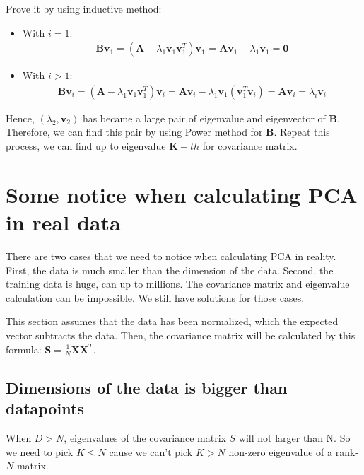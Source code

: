 \documentclass[a4paper, 12pt]{report}
\begin{document}
Prove it by using inductive method:
\begin{itemize}
    \item With $i = 1$: 
        \begin{eqnarray*}\mathbf{Bv}_1 = (\mathbf{A} - \lambda_1 \mathbf{v}_1\mathbf{v}_1^T) \mathbf{v_1} = \mathbf{Av}_1 - \lambda_1 \mathbf{v}_1 = \mathbf{0} 
        \end{eqnarray*}
    \item With $i > 1$:
        \begin{eqnarray*}
        \mathbf{Bv}_i = (\mathbf{A} - \lambda_1 \mathbf{v}_1 \mathbf{v}_1^T)\mathbf{v}_i = \mathbf{Av}_i - \lambda_1 \mathbf{v}_1 (\mathbf{v}_1^T \mathbf{v}_i) = \mathbf{Av}_i = \lambda_i \mathbf{v}_i
        \end{eqnarray*}
\end{itemize}



Hence, $(\lambda_2, \mathbf{v}_2)$ has became a large pair of eigenvalue and eigenvector of $\mathbf{B}$. Therefore, we can find this pair by using Power method for $\mathbf{B}$. Repeat this process, we can find up to eigenvalue $\mathbf{K}-th$ for covariance matrix.

\section{Some notice when calculating PCA in real data} 
\indent \par There are two cases that we need to notice when calculating PCA in reality. First, the data is much smaller than the dimension of the data. Second, the training data is huge, can up to millions. The covariance matrix and eigenvalue calculation can be impossible. We still have solutions for those cases.

This section assumes that the data has been normalized, which the expected vector subtracts the data. Then, the covariance matrix will be calculated by this formula: $\mathbf{S} = \frac{1}{N}\mathbf{X}\mathbf{X}^T$.
\subsection{Dimensions of the data is bigger than datapoints}
\indent \par When $D > N$, eigenvalues of the covariance matrix $S$ will not larger than N. So we need to pick $K \leq N$ cause we can't pick $ K > N $ non-zero eigenvalue of a rank-$N$ matrix.
\end{document}
